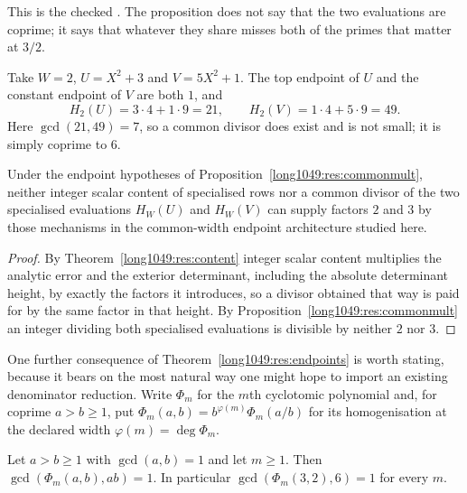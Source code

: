 \documentclass[11pt]{article}
\begin{document}
\noindent This is the checked
.  The proposition does not say that the two evaluations are coprime;
it says that whatever they share misses both of the primes that matter at
\(3/2\).

\begin{example}\label{long1049:ex:commonmult}
Take \(W=2\), \(U=X^2+3\) and \(V=5X^2+1\).  The top endpoint of \(U\) and the
constant endpoint of \(V\) are both \(1\), and
\[
 H_2(U)=3\cdot4+1\cdot9=21,\qquad H_2(V)=1\cdot4+5\cdot9=49 .
\]
Here \(\gcd(21,49)=7\), so a common divisor does exist and is not small; it
is simply coprime to \(6\).
\end{example}

\begin{corollary}\label{long1049:res:nomult}
Under the endpoint hypotheses of Proposition~\ref{long1049:res:commonmult}, neither
integer scalar content of specialised rows nor a common divisor of the two specialised
evaluations \(H_W(U)\) and \(H_W(V)\) can supply factors \(2\) and \(3\) by
those mechanisms in the common-width endpoint architecture studied here.
\end{corollary}

\begin{proof}
By Theorem~\ref{long1049:res:content} integer scalar content multiplies the analytic error and
the exterior determinant, including the absolute determinant height, by exactly
the factors it introduces, so a divisor obtained that way is paid for by the
same factor in that height.  By Proposition~\ref{long1049:res:commonmult} an integer
dividing both specialised evaluations is divisible by neither \(2\) nor \(3\).
\end{proof}

One further consequence of Theorem~\ref{long1049:res:endpoints} is worth stating,
because it bears on the most natural way one might hope to import an existing
denominator reduction.  Write $\Phi_m$ for the $m$th cyclotomic polynomial and,
for coprime $a>b\ge1$, put $\Phi_m(a,b)=b^{\varphi(m)}\Phi_m(a/b)$ for its
homogenisation at the declared width $\varphi(m)=\deg\Phi_m$.

\begin{proposition}
\label{long1049:res:cyclounit}
Let $a>b\ge1$ with $\gcd(a,b)=1$ and let $m\ge1$.  Then
$\gcd(\Phi_m(a,b),ab)=1$.  In particular $\gcd(\Phi_m(3,2),6)=1$ for every $m$.
\end{proposition}
\end{document}
